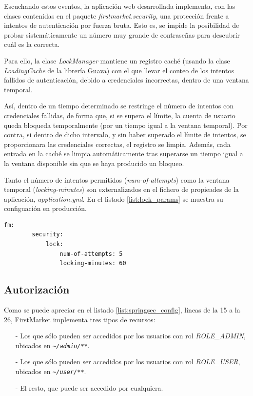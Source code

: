 \documentclass[a4paper,12pt,twoside,openright]{report}
\begin{document}
	Escuchando estos eventos, la aplicación web desarrollada implementa, con las clases contenidas en el paquete \emph{firstmarket.security},  una protección frente a intentos de autenticación por fuerza bruta. Esto es, se impide la posibilidad de probar sistemáticamente un número muy grande de contraseñas para descubrir cuál es la correcta.
	
	Para ello, la clase \emph{LockManager} mantiene un registro caché (usando la clase \emph{LoadingCache} de la librería \href{https://guava.dev/}{Guava}) con el que llevar el conteo de los intentos fallidos de autenticación, debido a credenciales incorrectas, dentro de una ventana temporal.
	
	Así, dentro de un tiempo determinado se restringe el número de intentos con credenciales fallidas, de forma que, si se supera el límite, la cuenta de usuario queda bloqueda temporalmente (por un tiempo igual a la ventana temporal). Por contra, si dentro de dicho intervalo, y sin haber superado el límite de intentos, se proporcionara las credenciales correctas, el registro se limpia. Además, cada entrada en la caché se limpia automáticamente tras superarse un tiempo igual a la ventana disponible sin que se haya producido un bloqueo.
	
	Tanto el número de intentos permitidos (\emph{num-of-attempts}) como la ventana temporal (\emph{locking-minutes}) son externalizados en el fichero de propieades de la aplicación, \emph{application.yml}. En el listado \ref{list:lock_params} se muestra su configuación en producción.
	\\
	
	\begin{lstlisting}[caption=Parámetros para configurar la prevención de autenticación por fuerza bruta,label=list:lock_params]
	fm:
		security:
			lock:
				num-of-attempts: 5
				locking-minutes: 60
	\end{lstlisting}
	

	\subsection{Autorización}
	Como se puede apreciar en el listado \ref{list:springsec_config}, líneas de la 15 a la 26, FirstMarket implementa tres tipos de recursos: 
	
	\begin{itemize}
		\item[-] Los que sólo pueden ser accedidos por los usuarios con rol \emph{ROLE\_ADMIN}, ubicados en \emph{\nolinkurl{~/admin/**}}.
		\item[-] Los que sólo pueden ser accedidos por los usuarios con rol \emph{ROLE\_USER}, ubicados en \emph{\nolinkurl{~/user/**}}.
		\item[-] El resto, que puede ser accedido por cualquiera.
	\end{itemize}
\end{document}
